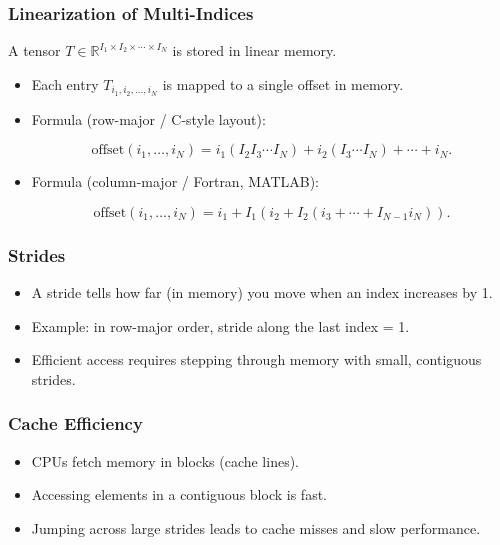\documentclass[
  letterpaper,
  DIV=11,
  numbers=noendperiod]{scrreprt}
\providecommand{\tightlist}{%
  \setlength{\itemsep}{0pt}\setlength{\parskip}{0pt}}
\begin{document}
\subsubsection{Linearization of
Multi-Indices}\label{linearization-of-multi-indices}

A tensor \(T \in \mathbb{R}^{I_1 \times I_2 \times \cdots \times I_N}\)
is stored in linear memory.

\begin{itemize}
\item
  Each entry \(T_{i_1,i_2,\dots,i_N}\) is mapped to a single offset in
  memory.
\item
  Formula (row-major / C-style layout):

  \[
  \text{offset}(i_1,\dots,i_N) = i_1 (I_2 I_3 \cdots I_N) + i_2 (I_3 \cdots I_N) + \cdots + i_N.
  \]
\item
  Formula (column-major / Fortran, MATLAB):

  \[
  \text{offset}(i_1,\dots,i_N) = i_1 + I_1(i_2 + I_2(i_3 + \cdots + I_{N-1} i_N)).
  \]
\end{itemize}

\subsubsection{Strides}\label{strides}

\begin{itemize}
\tightlist
\item
  A stride tells how far (in memory) you move when an index increases by
  1.
\item
  Example: in row-major order, stride along the last index = 1.
\item
  Efficient access requires stepping through memory with small,
  contiguous strides.
\end{itemize}

\subsubsection{Cache Efficiency}\label{cache-efficiency}

\begin{itemize}
\tightlist
\item
  CPUs fetch memory in blocks (cache lines).
\item
  Accessing elements in a contiguous block is fast.
\item
  Jumping across large strides leads to cache misses and slow
  performance.
\end{itemize}
\end{document}
